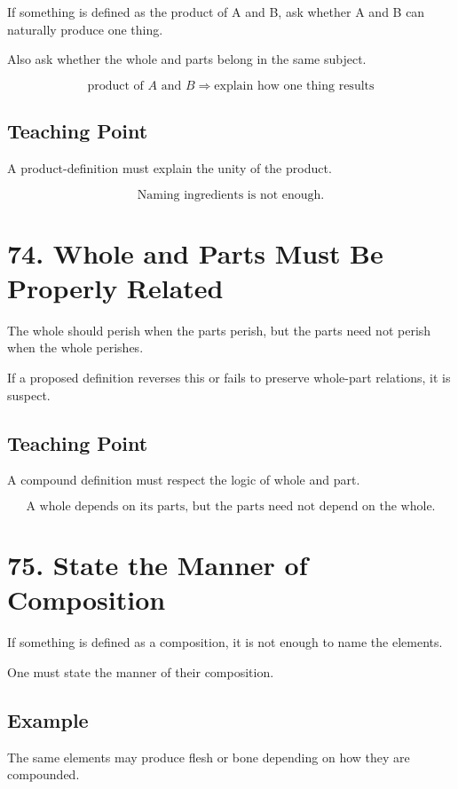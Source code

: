 \documentclass[12pt]{article}
\begin{document}
If something is defined as the product of A and B, ask whether A and B can
naturally produce one thing.

Also ask whether the whole and parts belong in the same subject.

\[
\text{product of } A \text{ and } B
\Rightarrow
\text{explain how one thing results}
\]

\subsection*{Teaching Point}

A product-definition must explain the unity of the product.

\[
\boxed{
\text{Naming ingredients is not enough.}
}
\]

\section*{74. Whole and Parts Must Be Properly Related}

The whole should perish when the parts perish, but the parts need not perish
when the whole perishes.

If a proposed definition reverses this or fails to preserve whole-part
relations, it is suspect.

\subsection*{Teaching Point}

A compound definition must respect the logic of whole and part.

\[
\boxed{
\text{A whole depends on its parts, but the parts need not depend on the whole.}
}
\]

\section*{75. State the Manner of Composition}

If something is defined as a composition, it is not enough to name the elements.

One must state the manner of their composition.

\subsection*{Example}

The same elements may produce flesh or bone depending on how they are
compounded.
\end{document}
